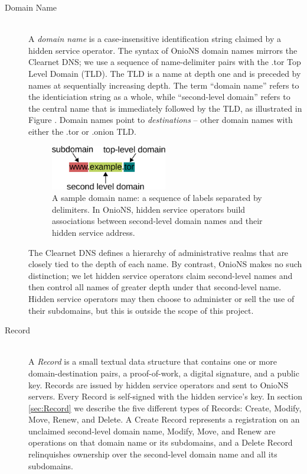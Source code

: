 \begin{description}
	\item[Domain Name] \hfill \\
		A \emph{domain name} is a case-insensitive identification string claimed by a hidden service operator. The syntax of OnioNS domain names mirrors the Clearnet DNS; we use a sequence of name-delimiter pairs with the .tor Top Level Domain (TLD). The TLD is a name at depth one and is preceded by names at sequentially increasing depth. The term ``domain name'' refers to the identiciation string as a whole, while ``second-level domain'' refers to the central name that is immediately followed by the TLD, as illustrated in Figure \label{fig:sampleDomain}. Domain names point to \emph{destinations} -- other domain names with either the .tor or .onion TLD.
		
		\begin{figure}[htbp]
			\centering
			\includegraphics[width=0.5\textwidth]{images/domain-name.eps}
			\caption{A sample domain name: a sequence of labels separated by delimiters. In OnioNS, hidden service operators build associations between second-level domain names and their hidden service address.}
			\label{fig:sampleDomain}
		\end{figure}
		
	The Clearnet DNS defines a hierarchy of administrative realms that are closely tied to the depth of each name. By contrast, OnioNS makes no such distinction; we let hidden service operators claim second-level names and then control all names of greater depth under that second-level name. Hidden service operators may then choose to administer or sell the use of their subdomains, but this is outside the scope of this project.

	\item[Record] \hfill \\
		A \emph{Record} is a small textual data structure that contains one or more domain-destination pairs, a proof-of-work, a digital signature, and a public key. Records are issued by hidden service operators and sent to OnioNS servers. Every Record is self-signed with the hidden service's key. In section \ref{sec:Record} we describe the five different types of Records: Create, Modify, Move, Renew, and Delete. A Create Record represents a registration on an unclaimed second-level domain name, Modify, Move, and Renew are operations on that domain name or its subdomains, and a Delete Record relinquishes ownership over the second-level domain name and all its subdomains.


\end{description}
